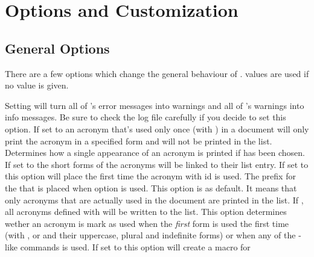\documentclass[load-preamble+]{cnltx-doc}
\begin{document}
\section{Options and Customization}\label{sec:customization}
\subsection{General Options}
There are a few options which change the general behaviour of \acro.
 values are used if no value is given.
\begin{options}
    Setting  will turn all of \acro's error messages
    into warnings and all of \acro's warnings into info messages.  Be sure to
    check the log file carefully if you decide to set this option.
    If set to  an acronym that's used only once (with ) in a
    document will only print the acronym in a specified form and will not be
    printed in the list.
    Determines how a single appearance of an acronym is
    printed if  has been chosen.
    If set to  the short forms of the acronyms will be linked to
    their list entry.
    If set to  this option will place
     the first time the acronym with
    \ac{id}  is used. 
    The prefix for the  that is placed when option
     is used.
    This option is  as default.  It means that only acronyms that
    are actually used in the document are printed in the list.  If
    , all acronyms defined with  will be
    written to the list.
    This option determines wether an acronym is mark as used when the
    \emph{first} form is used the first time (with ,  or
     and their uppercase, plural and indefinite forms) or when any
    of the -like commands is used.   
    If set to  this option will create a macro  for

\end{options}
\end{document}
